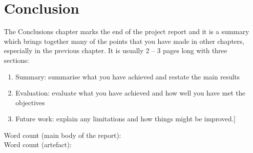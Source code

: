 \chapter{Conclusion}
The Conclusions chapter marks the end of the project report and it is a summary which brings together many of the points that you have made in other chapters, especially in the previous chapter. It is usually 2 – 3 pages long with three sections:
\begin{enumerate}
	\item Summary: summarise what you have achieved and restate the main results
	\item Evaluation: evaluate what you have achieved and how well you have met the objectives
	\item Future work: explain any limitations and how things might be improved.]
\end{enumerate}

\newline
Word count (main body of the report): 
\\
Word count (artefact): 
